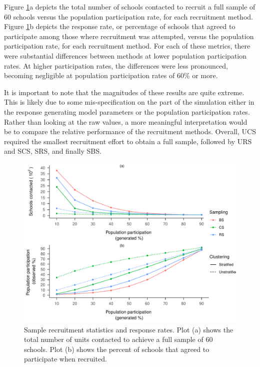 \documentclass[
  english,
  man,floatsintext]{apa6}
\begin{document}
Figure \ref{fig:fig-responses}a depicts the total number of schools contacted to recruit a full sample of 60 schools versus the population participation rate, for each recruitment method. Figure \ref{fig:fig-responses}b depicts the response rate, or percentage of schools that agreed to participate among those where recruitment was attempted, versus the population participation rate, for each recruitment method. For each of these metrics, there were substantial differences between methods at lower population participation rates. At higher participation rates, the differences were less pronounced, becoming negligible at population participation rates of 60\% or more.

It is important to note that the magnitudes of these results are quite extreme. This is likely due to some mis-specification on the part of the simulation either in the response generating model parameters or the population participation rates. Rather than looking at the raw values, a more meaningful interpretation would be to compare the relative performance of the recruitment methods. Overall, UCS required the smallest recruitment effort to obtain a full sample, followed by URS and SCS, SRS, and finally SBS.



\begin{figure}
\centering
\includegraphics{6---Paper_files/figure-latex/fig-responses-1.pdf}
\caption{\label{fig:fig-responses}Sample recruitment statistics and response rates. Plot (a) shows the total number of units contacted to achieve a full sample of 60 schools. Plot (b) shows the percent of schools that agreed to participate when recruited.}
\end{figure}
\end{document}
